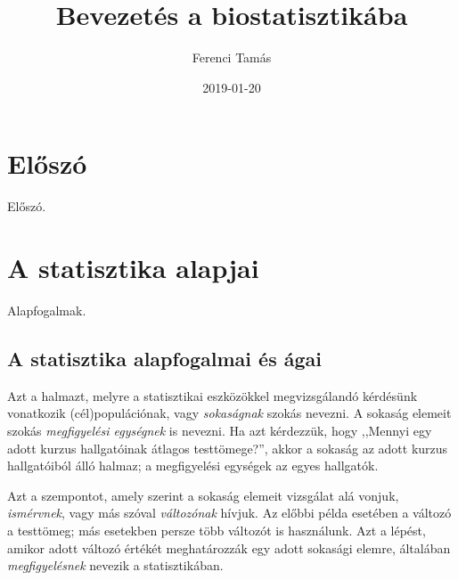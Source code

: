 \documentclass[]{book}
\title{Bevezetés a biostatisztikába}
\author{Ferenci Tamás}
\date{2019-01-20}
\begin{document}
\maketitle

{
\setcounter{tocdepth}{1}
\tableofcontents
}
\chapter{Előszó}\label{eloszo}

Előszó.

\chapter{A statisztika alapjai}\label{a-statisztika-alapjai}

Alapfogalmak.

\section{A statisztika alapfogalmai és
ágai}\label{a-statisztika-alapfogalmai-es-agai}

Azt a halmazt, melyre a statisztikai eszközökkel megvizsgálandó
kérdésünk vonatkozik (cél)populációnak, vagy \emph{sokaságnak} szokás
nevezni. A sokaság elemeit szokás \emph{megfigyelési egységnek} is
nevezni. Ha azt kérdezzük, hogy ,,Mennyi egy adott kurzus hallgatóinak
átlagos testtömege?'', akkor a sokaság az adott kurzus hallgatóiból álló
halmaz; a megfigyelési egységek az egyes hallgatók.

Azt a szempontot, amely szerint a sokaság elemeit vizsgálat alá vonjuk,
\emph{ismérvnek}, vagy más szóval \emph{változónak} hívjuk. Az előbbi
példa esetében a változó a testtömeg; más esetekben persze több változót
is használunk. Azt a lépést, amikor adott változó értékét meghatározzák
egy adott sokasági elemre, általában \emph{megfigyelésnek} nevezik a
statisztikában.
\end{document}
